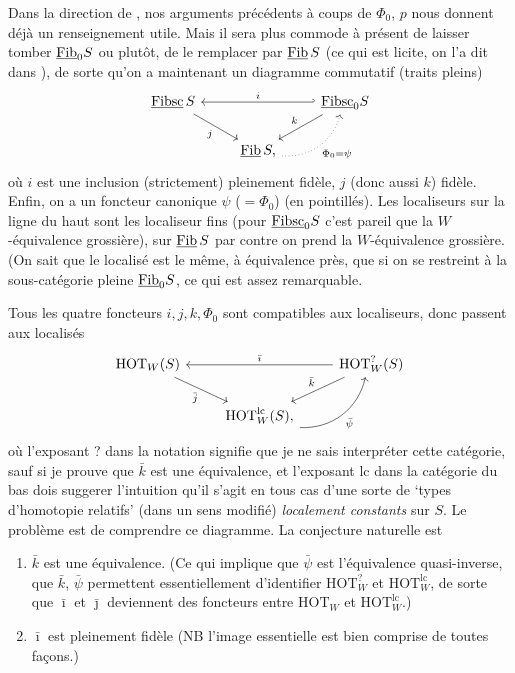 Dans la direction de , nos arguments précédents à coups de $\Phi_0$, $p$ nous donnent déjà un renseignement utile. Mais il sera plus commode à présent de laisser tomber $\underline{\mathrm{Fib}}_0 S$ ou plutôt, de le remplacer par $\underline{\mathrm{Fib}}\, S$ (ce qui est licite, on l'a dit dans ), de sorte qu'on a maintenant un diagramme commutatif (traits pleins)
\[
\begin{tikzcd}
\uu{Fibsc}\, S \arrow[dr, "j"'] & & \uu{Fibsc}_0 S \arrow[ll, hook', "i"'] \arrow[dl, "k"'] \\
& \uu{Fib}\, S, \arrow[ur, dotted, bend right=40, "\Phi_0=\psi"'] &
\end{tikzcd}
\]
où $i$ est une inclusion (strictement) pleinement fidèle, $j$ (donc aussi $k$) fidèle. Enfin, on a un foncteur canonique $\psi$ ($= \Phi_0$) (en pointillés). Les localiseurs sur la ligne du haut sont les localiseur fins (pour $\underline{\mathrm{Fibsc}}_0 S$ c'est pareil que la $W$-équivalence grossière), sur $\underline{\mathrm{Fib}}\, S$ %
par contre on prend la $W$-équivalence grossière. (On sait que le localisé est le même, à équivalence près, que si on se restreint à la sous-catégorie pleine $\underline{\mathrm{Fib}}_0 S$, ce qui est assez remarquable. %

Tous les quatre foncteurs $i, j, k, \Phi_0$ sont compatibles aux localiseurs, donc passent aux localisés
\[
\begin{tikzcd}
\mathrm{HOT}_W(S) \arrow[dr, "\bar{j}"'] & & \mathrm{HOT}^{?}_W(S) \arrow[ll, "\bar{\imath}"'] \arrow[dl, "\bar{k}"'] \\
& \mathrm{HOT}^{\mathrm{lc}}_W(S), \arrow[ur, bend right=40, "\bar{\psi}"'] &
\end{tikzcd}
\]
où l'exposant ? dans la notation signifie que je ne sais interpréter cette catégorie, sauf si je prouve que $\bar{k}$ est une équivalence, et l'exposant lc dans la catégorie du bas dois suggerer l'intuition qu'il s'agit en tous cas d'une sorte de `types d'homotopie relatifs' (dans un sens modifié) \textit{localement constants} sur $S$. Le problème est de comprendre ce diagramme. La conjecture naturelle est %

\begin{enumerate}[leftmargin=*]
\item[$1^o$)] $\bar{k}$ est une équivalence. (Ce qui implique que $\bar{\psi}$ est l'équivalence quasi-inverse, que $\bar{k}$, $\bar{\psi}$ permettent essentiellement d'identifier $\mathrm{HOT}^{?}_W$ et $\mathrm{HOT}^{\mathrm{lc}}_W$, de sorte que $\bar{\imath}$ et $\bar{\jmath}$ deviennent des foncteurs entre $\mathrm{HOT}_W$ et $\mathrm{HOT}^{\mathrm{lc}}_W$.)

\item[$2^o$)] $\bar{\imath}$ est pleinement fidèle (NB l'image essentielle est bien comprise de toutes façons.)
\end{enumerate}

